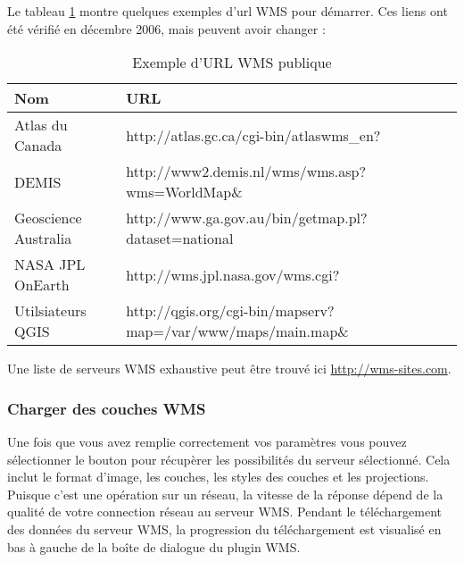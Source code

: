 Le tableau \ref{tab:wms_example_urls} montre quelques exemples d'url WMS
pour d\'emarrer. Ces liens ont \'et\'e v\'erifi\'e en d\'ecembre 2006, mais peuvent
avoir changer :


\begin{table}[ht]
\centering
\caption{Exemple d'URL WMS publique}\label{tab:wms_example_urls}\medskip
 \begin{tabular}{|l|l|}
\hline \textbf{Nom}        & \textbf{URL} \\
\hline Atlas du Canada      & http://atlas.gc.ca/cgi-bin/atlaswms\_en? \\
\hline DEMIS                & http://www2.demis.nl/wms/wms.asp?wms=WorldMap\& \\
\hline Geoscience Australia &
http://www.ga.gov.au/bin/getmap.pl?dataset=national \\
\hline NASA JPL OnEarth     & http://wms.jpl.nasa.gov/wms.cgi? \\
\hline Utilsiateurs QGIS &
http://qgis.org/cgi-bin/mapserv?map=/var/www/maps/main.map\& \\
\hline
\end{tabular}
\end{table}

Une liste de serveurs WMS exhaustive peut \^etre trouv\'e ici
\url{http://wms-sites.com}.

\subsubsection{Charger des
couches WMS}\label{sec:ogc-wms-layers}

Une fois que vous avez remplie correctement vos param\`etres vous pouvez
s\'electionner le bouton  pour r\'ecup\`erer les possibilit\'es du
serveur s\'electionn\'e. Cela inclut le format d'image, les couches, les styles des
couches et les projections. Puisque c'est une op\'eration sur un r\'eseau, la
vitesse de la r\'eponse d\'epend de la qualit\'e de votre connection r\'eseau au
serveur WMS. Pendant le t\'el\'echargement des donn\'ees du serveur WMS, la
progression du t\'el\'echargement est visualis\'e en bas \`a gauche de la bo\^ite de
dialogue du plugin WMS.

